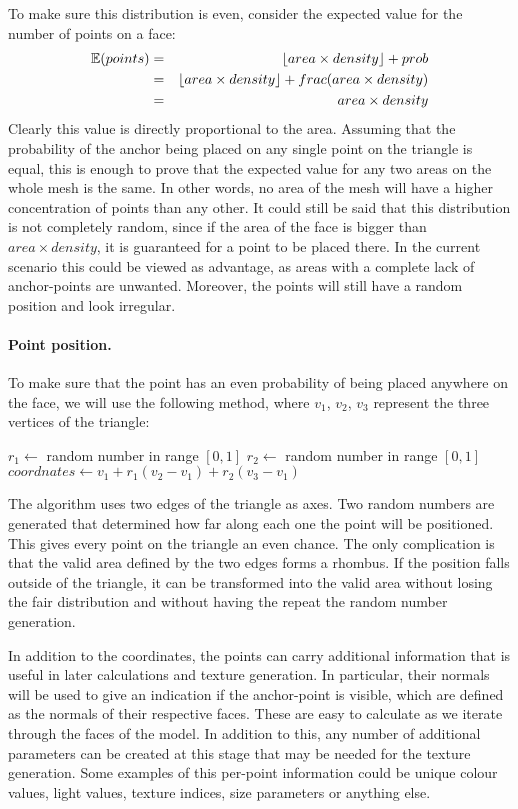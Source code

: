 \documentclass[a4paper, 12pt]{article}
\DeclarePairedDelimiter{\floor}{\lfloor}{\rfloor}
\begin{document}
To make sure this distribution is even, consider the expected value for the number of points on a face:
\begin{eqnarray*}
\mathbb{E} (points) & = & \floor{area \times density} + prob \\
& = & \floor{area \times density} + frac(area \times density) \\
& = & area \times density
\end{eqnarray*}
Clearly this value is directly proportional to the area. Assuming that the probability of the anchor being placed on any single point on the triangle is equal, this is enough to prove that the expected value for any two areas on the whole mesh is the same. In other words, no area of the mesh will have a higher concentration of points than any other. It could still be said that this distribution is not completely random, since if the area of the face is bigger than $area \times density$, it is guaranteed for a point to be placed there. In the current scenario this could be viewed as advantage, as areas with a complete lack of anchor-points are unwanted. Moreover, the points will still have a random position and look irregular.

\paragraph{Point position.}
To make sure that the point has an even probability of being placed anywhere on the face, we will use the following method, where $v_1$, $v_2$, $v_3$ represent the three vertices of the triangle:

\begin{algorithm}[H]
$r_1 \leftarrow$ random number in range $[0,1]$\;
$r_2 \leftarrow$ random number in range $[0,1]$\;
$coordnates \leftarrow v_1 + r_1(v_2-v_1) + r_2(v_3-v_1)$
\end{algorithm}

The algorithm uses two edges of the triangle as axes. Two random numbers are generated that determined how far along each one the point will be positioned. This gives every point on the triangle an even chance. The only complication is that the valid area defined by the two edges forms a rhombus. If the position falls outside of the triangle, it can be transformed into the valid area without losing the fair distribution and without having the repeat the random number generation.

In addition to the coordinates, the points can carry additional information that is useful in later calculations and texture generation. In particular, their normals will be used to give an indication if the anchor-point is visible, which are defined as the normals of their respective faces. These are easy to calculate as we iterate through the faces of the model. In addition to this, any number of additional parameters can be created at this stage that may be needed for the texture generation. Some examples of this per-point information could be unique colour values, light values, texture indices, size parameters or anything else.
\end{document}
